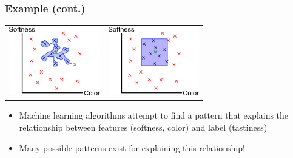 \documentclass[10pt]{beamer}
\begin{document}
\begin{frame}
  \frametitle{Example (cont.)}
  \begin{center}
  \begin{tabular}{ll}
  \includegraphics[height=3cm]{images/papaya2.png} & \includegraphics[height=3cm]{images/papaya3.png}
  \end{tabular}
  \end{center}
  \begin{itemize}
	\item Machine learning algorithms attempt to find a {\color{blue} pattern} that explains the relationship between {\color{green} features} (softness, color) and {\color{orange} label} (tastiness)
	\item Many possible patterns exist for explaining this relationship!
  \end{itemize}
\end{frame}
\end{document}
